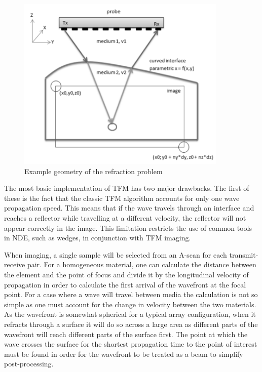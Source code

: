\begin{figure}[htb]
\centering
		\includegraphics[width=100mm]{surface2.png}
		\caption{Example geometry of the refraction problem}
		\label{fig:cuetfm_geo_descriptor}
\end{figure}

The most basic implementation of TFM has two major drawbacks. The first of these is the fact that the classic TFM algorithm accounts for only one wave propagation speed\cite{holmes_post-processing_2005}. This means that if the wave travels through an interface and reaches a reflector while travelling at a different velocity, the reflector will not appear correctly in the image. This limitation restricts the use of common tools in NDE, such as wedges, in conjunction with TFM imaging.

When imaging, a single sample will be selected from an A-scan for each transmit-receive pair. For a homogeneous material, one can calculate the distance between the element and the point of focus and divide it by the longitudinal velocity of propagation in order to calculate the first arrival of the wavefront at the focal point. For a case where a wave will travel between media the calculation is not so simple as one must account for the change in velocity between the two materials. As the wavefront is somewhat spherical for a typical array configuration, when it refracts through a surface it will do so across a large area as different parts of the wavefront will reach different parts of the surface first. The point at which the wave crosses the surface for the shortest propagation time to the point of interest must be found in order for the wavefront to be treated as a beam to simplify post-processing.

